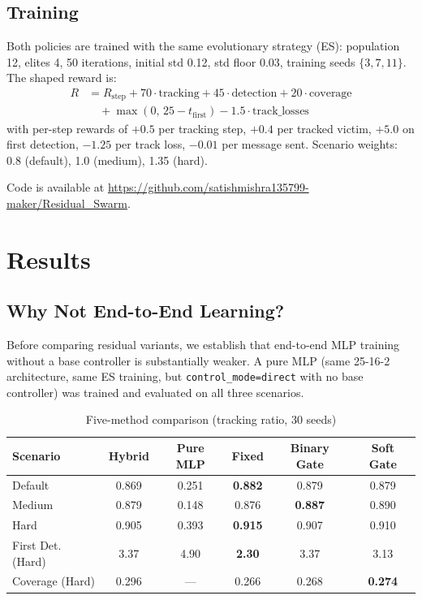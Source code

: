 \documentclass[conference]{IEEEtran}
\begin{document}
\subsection{Training}

Both policies are trained with the same evolutionary strategy (ES): population 12,
elites 4, 50 iterations, initial std 0.12, std floor 0.03, training seeds $\{3, 7, 11\}$.
The shaped reward is:
\begin{align*}
  R &= R_{\text{step}} + 70 \cdot \text{tracking} + 45 \cdot \text{detection}
      + 20 \cdot \text{coverage} \\
    &\quad + \max(0,\, 25 - t_{\text{first}}) - 1.5 \cdot \text{track\_losses}
\end{align*}
with per-step rewards of $+0.5$ per tracking step, $+0.4$ per tracked victim,
$+5.0$ on first detection, $-1.25$ per track loss, $-0.01$ per message sent.
Scenario weights: 0.8 (default), 1.0 (medium), 1.35 (hard).

Code is available at \url{https://github.com/satishmishra135799-maker/Residual_Swarm}.

\section{Results}

\subsection{Why Not End-to-End Learning?}

Before comparing residual variants, we establish that end-to-end MLP training without
a base controller is substantially weaker. A pure MLP (same 25-16-2 architecture,
same ES training, but \texttt{control\_mode=direct} with no base controller) was
trained and evaluated on all three scenarios.

\begin{table}[t]
\centering
\caption{Five-method comparison (tracking ratio, 30 seeds)}
\small
\begin{tabular}{@{}lccccc@{}}
\toprule
Scenario & Hybrid & Pure MLP & Fixed & Binary Gate & Soft Gate \\
\midrule
Default & 0.869 & 0.251 & \textbf{0.882} & 0.879 & 0.879 \\
Medium  & 0.879 & 0.148 & 0.876 & \textbf{0.887} & 0.890 \\
Hard    & 0.905 & 0.393 & \textbf{0.915} & 0.907 & 0.910 \\
\midrule
First Det. (Hard) & 3.37 & 4.90 & \textbf{2.30} & 3.37 & 3.13 \\
Coverage (Hard)   & 0.296 & — & 0.266 & 0.268 & \textbf{0.274} \\
\bottomrule
\end{tabular}
\end{table}
\end{document}
